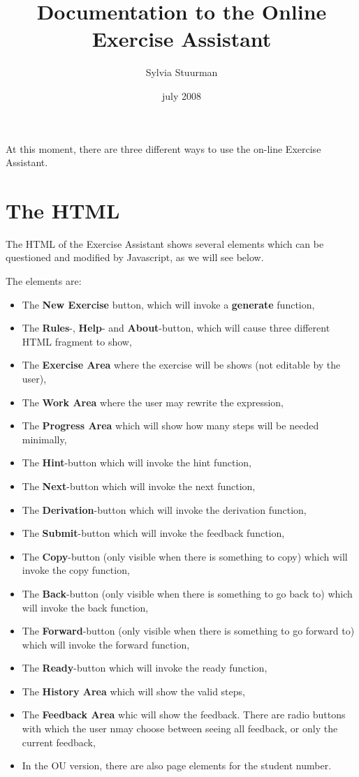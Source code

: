 \documentclass{article}
\begin{document}
\title{Documentation to the Online Exercise Assistant}
\author{Sylvia Stuurman}
\date{july 2008}
\maketitle
At this moment, there are three different ways to use the on-line Exercise Assistant.

\section{The HTML}
The HTML of the Exercise Assistant shows several elements which can be questioned and modified by Javascript, as we will see below.

The elements are:
\begin{itemize}
\item The \textbf{New Exercise} button, which will invoke a \textbf{generate} function,
\item The \textbf{Rules}-, \textbf{Help}- and \textbf{About}-button, which will cause three different HTML fragment to show,
\item The \textbf{Exercise Area} where the exercise will be shows (not editable by the user),
\item The \textbf{Work Area} where the user may rewrite the expression,
\item The \textbf{Progress Area} which will show how many steps will be needed minimally,
\item The \textbf{Hint}-button which will invoke the hint function,
\item The \textbf{Next}-button which will invoke the next function,
\item The \textbf{Derivation}-button which will invoke the derivation function,
\item The \textbf{Submit}-button which will invoke the feedback function,
\item The \textbf{Copy}-button (only visible when there is something to copy) which will invoke the copy function,
\item The \textbf{Back}-button (only visible when there is something to go back to) which will invoke the back function,
\item The \textbf{Forward}-button (only visible when there is something to go forward to) which will invoke the forward function,
\item The \textbf{Ready}-button which will invoke the ready function,
\item The \textbf{History Area} which will show the valid steps,
\item The \textbf{Feedback Area} whic will show the feedback. There are radio buttons with which the user nmay choose between seeing all feedback, or only the current feedback,
\item In the OU version, there are also page elements for the student number.
\end{itemize}
\end{document}
